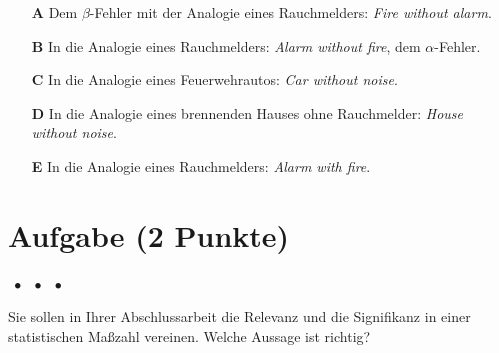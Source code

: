 \documentclass[a4paper, 9pt]{scrartcl}\usepackage[]{graphicx}\usepackage[]{xcolor}
\begin{document}
\begin{enumerate}
\item [\textbf{A} \msquare] Dem $\beta$-Fehler mit der Analogie eines Rauchmelders: \textit{Fire without alarm}.
\item [\textbf{B} \msquare] In die Analogie eines Rauchmelders: \textit{Alarm without fire}, dem $\alpha$-Fehler.
\item [\textbf{C} \msquare] In die Analogie eines Feuerwehrautos: \textit{Car without noise}.
\item [\textbf{D} \msquare] In die Analogie eines brennenden Hauses ohne Rauchmelder: \textit{House without noise}.
\item [\textbf{E} \msquare] In die Analogie eines Rauchmelders: \textit{Alarm with fire}.
\end{enumerate}

\section{Aufgabe \hfill (2 Punkte)}

\ifcollection
\begin{flushright}
\tiny\vspace{-2Ex}
\textbf{\examinhaltstart}
\exammodulestat $\;\bullet$
\exammodulestatbbv $\;\bullet$
\exammodulestatversuch $\;\bullet$
\exammodulebiostat
\vspace{-1Ex}
\end{flushright}
\fi




Sie sollen in Ihrer Abschlussarbeit die Relevanz und die Signifikanz in einer statistischen Maßzahl vereinen. Welche Aussage ist richtig?
\end{document}
